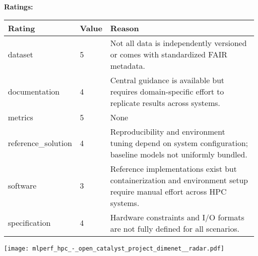 {{{\bf Ratings:} ~ \\

\begin{tabular}{p{} p{} p{}}
\hline
Rating & Value & Reason \\
\hline
dataset & 5 & Not all data is independently versioned or comes with standardized FAIR metadata.
 \\
documentation & 4 & Central guidance is available but requires domain-specific effort to replicate results across systems.
 \\
metrics & 5 & None
 \\
reference\_solution & 4 & Reproducibility and environment tuning depend on system configuration; baseline models not uniformly bundled.
 \\
software & 3 & Reference implementations exist but containerization and environment setup require manual effort across HPC systems.
 \\
specification & 4 & Hardware constraints and I/O formats are not fully defined for all scenarios.
 \\
\hline
\end{tabular}

\texttt{[image: mlperf\_hpc\_-\_open\_catalyst\_project\_dimenet\_\_radar.pdf]}
}}
\clearpage